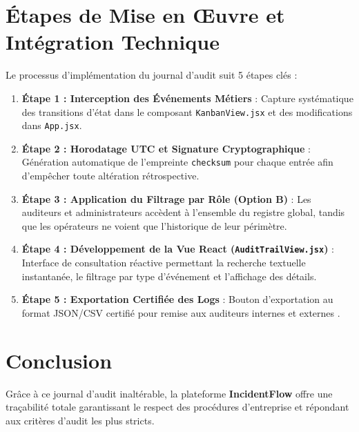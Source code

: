 \documentclass[11pt,a4paper]{article}
\begin{document}
\section{Étapes de Mise en Œuvre et Intégration Technique}

Le processus d'implémentation du journal d'audit suit 5 étapes clés :

\begin{enumerate}
    \item \textbf{Étape 1 : Interception des Événements Métiers} : Capture systématique des transitions d'état dans le composant \texttt{KanbanView.jsx} et des modifications dans \texttt{App.jsx}.
    \item \textbf{Étape 2 : Horodatage UTC et Signature Cryptographique} : Génération automatique de l'empreinte \texttt{checksum} pour chaque entrée afin d'empêcher toute altération rétrospective.
    \item \textbf{Étape 3 : Application du Filtrage par Rôle (Option B)} : Les auditeurs et administrateurs accèdent à l'ensemble du registre global, tandis que les opérateurs ne voient que l'historique de leur périmètre.
    \item \textbf{Étape 4 : Développement de la Vue React (\texttt{AuditTrailView.jsx})} : Interface de consultation réactive permettant la recherche textuelle instantanée, le filtrage par type d'événement et l'affichage des détails.
    \item \textbf{Étape 5 : Exportation Certifiée des Logs} : Bouton d'exportation au format JSON/CSV certifié pour remise aux auditeurs internes et externes .
\end{enumerate}

\section{Conclusion}

Grâce à ce journal d'audit inaltérable, la plateforme \textbf{IncidentFlow} offre une traçabilité totale garantissant le respect des procédures d'entreprise et répondant aux critères d'audit les plus stricts.
\end{document}

